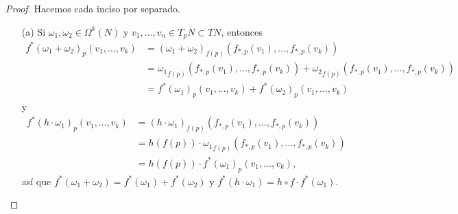 \documentclass[11pt]{article}
\begin{document}
\begin{proof} Hacemos cada inciso por separado.
\begin{itemize}[listparindent = \parindent]
\item[(a)] Si $\omega_1,\omega_2 \in \Omega^k(N)$ y $v_1, \dots, v_n \in T_pN \subset TN$, entonces
\begin{align*}
f^*(\omega_1+\omega_2)_p(v_1, \dots, v_k) &= (\omega_1+\omega_2)_{f(p)}(f_{\ast,p}(v_1), \dots, f_{\ast,p}(v_k))\\
&= {\omega_1}_{f(p)}(f_{\ast,p}(v_1), \dots, f_{\ast,p}(v_k)) + {\omega_2}_{f(p)}(f_{\ast,p}(v_1), \dots, f_{\ast,p}(v_k))\\
& = f^*(\omega_1)_p(v_1, \dots, v_k) + f^*(\omega_2)_p(v_1,\dots,v_k)
\end{align*}
y
\begin{align*}
f^*(h \cdot \omega_1)_p(v_1, \dots, v_k) &= (h \cdot \omega_1)_{f(p)}(f_{\ast,p}(v_1),\dots,f_{\ast,p}(v_k))\\
& = h(f(p)) \cdot {\omega_1}_{f(p)}(f_{\ast,p}(v_1),\dots,f_{\ast,p}(v_k))\\
&= h(f(p)) \cdot f^*(\omega_1)_p(v_1,\dots,v_k),
\end{align*}
así que $f^*(\omega_1+\omega_2) = f^*(\omega_1) + f^*(\omega_2)$ y $f^*(h\cdot \omega_1) = h\circ f\cdot f^*(\omega_1)$.


\end{itemize}
\end{proof}
\end{document}
